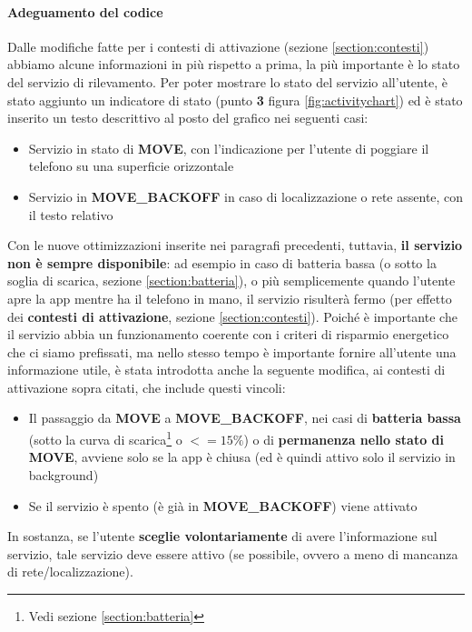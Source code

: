 \documentclass[a4paper,10pt]{memoir}
\begin{document}
\paragraph{Adeguamento del codice} Dalle modifiche fatte per i contesti di attivazione (sezione \ref{section:contesti}) abbiamo alcune informazioni in più rispetto a prima, la più importante è lo stato del servizio di rilevamento. Per poter mostrare lo stato del servizio all'utente, è stato aggiunto un indicatore di stato (punto \textbf{3} figura \ref{fig:activitychart}) ed è stato inserito un testo descrittivo al posto del grafico nei seguenti casi:

\begin{itemize}
\item Servizio in stato di \textbf{MOVE}, con l'indicazione per l'utente di poggiare il telefono su una superficie orizzontale
\item Servizio in \textbf{MOVE\_BACKOFF} in caso di localizzazione o rete assente, con il testo relativo
\end{itemize}

Con le nuove ottimizzazioni inserite nei paragrafi precedenti, tuttavia, \textbf{il servizio non è sempre disponibile}: ad esempio in caso di batteria bassa (o sotto la soglia di scarica, sezione \ref{section:batteria}), o più semplicemente quando l'utente apre la app mentre ha il telefono in mano, il servizio risulterà fermo (per effetto dei \textbf{contesti di attivazione}, sezione \ref{section:contesti}). Poiché è importante che il servizio abbia un funzionamento coerente con i criteri di risparmio energetico che ci siamo prefissati, ma nello stesso tempo è importante fornire all'utente una informazione utile, è stata introdotta anche la seguente modifica, ai contesti di attivazione sopra citati, che include questi vincoli:

\begin{itemize}
\item Il passaggio da \textbf{MOVE} a \textbf{MOVE\_BACKOFF}, nei casi di \textbf{batteria bassa} (sotto la curva di scarica\footnote{Vedi sezione \ref{section:batteria}} o $<= 15\%$) o di \textbf{permanenza nello stato di MOVE}, avviene solo se la app è chiusa (ed è quindi attivo solo il servizio in background)
\item Se il servizio è spento (è già in \textbf{MOVE\_BACKOFF}) viene attivato
\end{itemize}

In sostanza, se l'utente \textbf{sceglie volontariamente} di avere l'informazione sul servizio, tale servizio deve essere attivo (se possibile, ovvero a meno di mancanza di rete/localizzazione).
\end{document}
